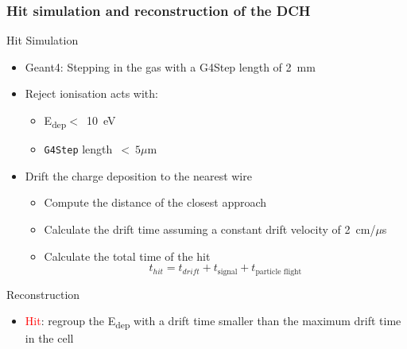 \documentclass[aspectratio=169, hyperref={colorlinks=true,pdfpagelabels=false,linkcolor=black}, xcolor=dvipsnames,10pt]{beamer}
\begin{document}
\begin{frame}
	\frametitle{Hit simulation and reconstruction of the DCH}
	
	\begin{block}{Hit Simulation}
	\begin{itemize}
	\item Geant4: Stepping in the gas with a G4Step length of 2~mm 
	\item Reject ionisation acts with:
		\begin{itemize}
		\item E\textsubscript{dep}$<$~10~eV
		\item \texttt{G4Step} length~$<~5\mu$m
		\end{itemize} 
	
	\item Drift the charge deposition to the nearest wire 
		\begin{itemize}
		\item Compute the distance of the closest approach
		\item Calculate the drift time assuming a constant drift velocity of 2~cm/$\mu$s
		\item Calculate the total time of the hit \\
		\begin{equation}
	      t_{hit} = t_{drift}+t_{\text{signal}}+t_{\text{particle flight}}
    		\end{equation}
		\end{itemize} 
	\end{itemize}
	\end{block}
		
	\begin{block}{Reconstruction}
		\begin{itemize}
		\item \textcolor{Red}{Hit}: regroup the E\textsubscript{dep} with a drift time smaller than the maximum drift time in the cell
		\end{itemize}
	\end{block}

	
	
\end{frame}
\end{document}
